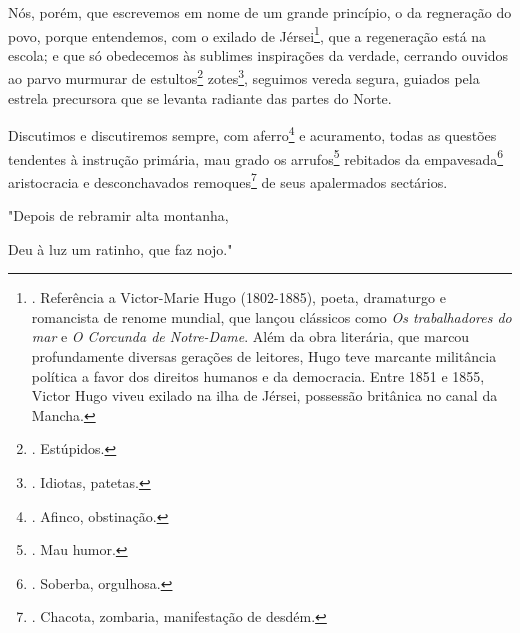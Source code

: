 Nós, porém, que escrevemos em nome de um grande princípio, o da
regneração do povo, porque entendemos, com o exilado de
Jérsei\footnote{. Referência a Victor-Marie Hugo (1802-1885), poeta,
  dramaturgo e romancista de renome mundial, que lançou clássicos como
  \emph{Os trabalhadores do mar} e \emph{O Corcunda de Notre-Dame}. Além
  da obra literária, que marcou profundamente diversas gerações de
  leitores, Hugo teve marcante militância política a favor dos direitos
  humanos e da democracia. Entre 1851 e 1855, Victor Hugo viveu exilado
  na ilha de Jérsei, possessão britânica no canal da Mancha.}, que a
regeneração está na escola; e que só obedecemos às sublimes inspirações
da verdade, cerrando ouvidos ao parvo murmurar de estultos\footnote{.
  Estúpidos.} zotes\footnote{. Idiotas, patetas.}, seguimos vereda
segura, guiados pela estrela precursora que se levanta radiante das
partes do Norte.

Discutimos e discutiremos sempre, com aferro\footnote{. Afinco,
  obstinação.} e acuramento, todas as questões tendentes à instrução
primária, mau grado os arrufos\footnote{. Mau humor.} rebitados da
empavesada\footnote{. Soberba, orgulhosa.} aristocracia e desconchavados
remoques\footnote{. Chacota, zombaria, manifestação de desdém.} de seus
apalermados sectários.

"Depois de rebramir alta montanha,

Deu à luz um ratinho, que faz nojo."

